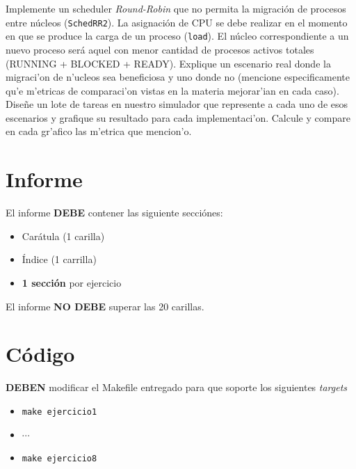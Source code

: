 \documentclass[a4paper,11pt]{article}
\begin{document}
\begin{ejercicio}
Implemente un scheduler \emph{Round-Robin} que no permita la migración de procesos entre núcleos (\texttt{SchedRR2}). La asignación de CPU se debe realizar en el momento en que se produce la carga de un proceso (\texttt{load}). El núcleo correspondiente a un nuevo proceso será aquel con menor cantidad de procesos activos totales (RUNNING + BLOCKED + READY). Explique un escenario real donde la migraci'on de n'ucleos sea beneficiosa y uno donde no (mencione especificamente qu'e m'etricas de comparaci'on vistas en la materia mejorar'ian en cada caso). Diseñe un lote de tareas en nuestro simulador que represente a cada uno de esos escenarios y grafique su resultado para cada implementaci'on. Calcule y compare en cada gr'afico las m'etrica que mencion'o.
\end{ejercicio}

\bigskip

\section*{Informe}

El informe \textbf{DEBE} contener las siguiente secciónes:

\begin{itemize}
    \item Carátula (1 carilla)

    \item Índice (1 carrilla)

    \item \textbf{1 sección} por ejercicio
\end{itemize}

El informe \textbf{NO DEBE} superar las 20 carillas.

\section*{Código}

\textbf{DEBEN} modificar el Makefile entregado para que soporte los siguientes
\textit{targets}

\begin{itemize}
    \item \texttt{make ejercicio1}

    \item $\cdots$

    \item \texttt{make ejercicio8}
\end{itemize}
\end{document}

